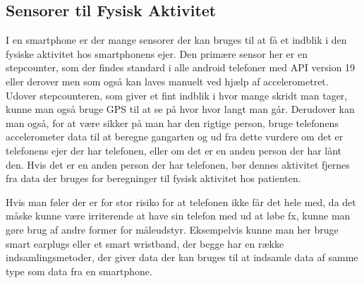 \subsection{Sensorer til Fysisk Aktivitet}
I en smartphone er der mange sensorer der kan bruges til at få et indblik i den fysiske aktivitet hos smartphonens ejer.
Den primære sensor her er en stepcounter, som der findes standard i alle android telefoner med API version 19 eller derover men som også kan laves manuelt ved hjælp af accelerometret.
Udover stepcounteren, som giver et fint indblik i hvor mange skridt man tager, kunne man også bruge GPS til at se på hvor hvor langt man går.
Derudover kan man også, for at være sikker på man har den rigtige person, bruge telefonens accelerometer data til at beregne gangarten og ud fra dette vurdere om det er telefonens ejer der har telefonen, eller om det er en anden person der har lånt den.
Hvis det er en anden person der har telefonen, bør dennes aktivitet fjernes fra data der bruges for beregninger til fysisk aktivitet hos patienten.

Hvis man føler der er for stor risiko for at telefonen ikke får det hele med, da det måske kunne være irriterende at have sin telefon med ud at løbe fx, kunne man gøre brug af andre former for måleudstyr.
Eksempelvis kunne man her bruge smart earplugs eller et smart wristband, der begge har en række indsamlingsmetoder, der giver data der kan bruges til at indsamle data af samme type som data fra en smartphone.
